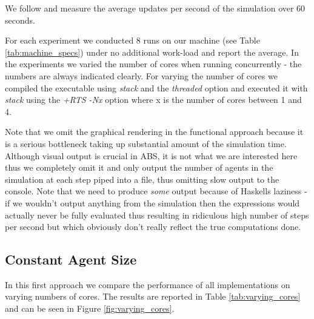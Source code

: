 We follow \cite{lysenko_framework_2008} and measure the average updates per second of the simulation over 60 seconds.

For each experiment we conducted 8 runs on our machine (see Table \ref{tab:machine_specs}) under no additional work-load and report the average. In the experiments we varied the number of cores when running concurrently - the numbers are always indicated clearly. For varying the number of cores we compiled the executable using \textit{stack} and the \textit{threaded} option and executed it with \textit{stack} using the \textit{+RTS -Nx} option where x is the number of cores between 1 and 4.

Note that we omit the graphical rendering in the functional approach because it is a serious bottleneck taking up substantial amount of the simulation time. Although visual output is crucial in ABS, it is not what we are interested here thus we completely omit it and only output the number of agents in the simulation at each step piped into a file, thus omitting slow output to the console. Note that we need to produce \textit{some} output because of Haskells laziness - if we wouldn't output anything from the simulation then the expressions would actually never be fully evaluated thus resulting in ridiculous high number of steps per second but which obviously don't really reflect the true computations done.

\subsection{Constant Agent Size}
In this first approach we compare the performance of all implementations on varying numbers of cores. The results are reported in Table \ref{tab:varying_cores} and can be seen in Figure \ref{fig:varying_cores}. 

